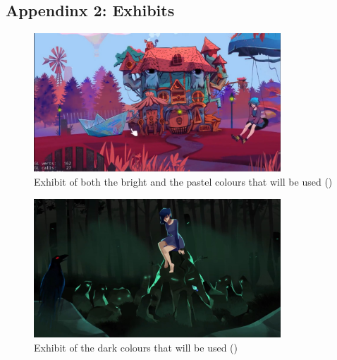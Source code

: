 \documentclass{article}
\begin{document}
\subsection{Appendinx 2: Exhibits}
    \bigskip
    \begin{figure}[h]
    \centering
    \caption{Exhibit of both the bright and the pastel colours that will be used (\cite{youtube_Lona}) }
    \includegraphics[width=350px]{Colours.JPG}
    \end{figure}
    
    \bigskip
    \begin{figure}[h]
    \centering
    \caption{Exhibit of the dark colours that will be used (\cite{youtube_Lona})}
    \includegraphics[width=350px]{Dark_Colours.JPG}
    \end{figure}
\newpage
{}
\printbibliography
\end{document}

